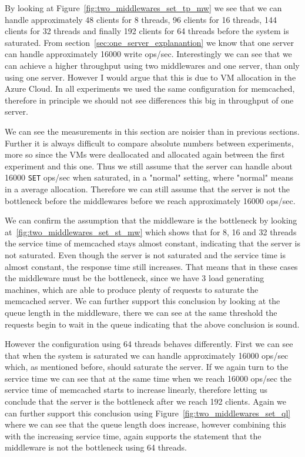 \documentclass[11pt,a4paper]{article}
\begin{document}
%
By looking at Figure~\ref{fig:two_middlewares_set_tp_mw} we see that we can handle approximately 48 clients for 8 threads, 96 clients for 16 threads, 144 clients for 32 threads and finally 192 clients for 64 threads before the system is saturated.
%
From section~\ref{sec:one_server_explanantion} we know that one server can handle approximately 16000 write ops/sec.
%
Interestingly we can see that we can achieve a higher throughput using two middlewares and one server, than only using one server.
%
However I would argue that this is due to VM allocation in the Azure Cloud.
%
In all experiments we used the same configuration for memcached, therefore in principle we should not see differences this big in throughput of one server.

We can see the measurements in this section are noisier than in previous sections.
%
Further it is always difficult to compare absolute numbers between experiments, more so since the VMs were deallocated and allocated again between the first experiment and this one.
%
Thus we still assume that the server can handle about 16000 \texttt{SET} ops/sec when saturated, in a "normal" setting, where "normal" means in a average allocation.
%
Therefore we can still assume that the server is not the bottleneck before the middlewares before we reach approximately 16000 ops/sec.
%
\par
%
We can confirm the assumption that the middleware is the bottleneck by looking at~\ref{fig:two_middlewares_set_st_mw} which shows that for 8, 16 and 32 threads the service time of memcached stays almost constant, indicating that the server is not saturated. 
%
Even though the server is not saturated and the service time is almost constant, the response time still increases.
%
That means that in these cases the middleware must be the bottleneck, since we have 3 load generating machines, which are able to produce plenty of requests to saturate the memcached server.
%
We can further support this conclusion by looking at the queue length in the middleware, there we can see at the same threshold the requests begin to wait in the queue indicating that the above conclusion is sound.
%
\par
%
However the configuration using 64 threads behaves differently.
%
First we can see that when the system is saturated we can handle approximately 16000 ops/sec which, as mentioned before, should saturate the server.
%
If we again turn to the service time we can see that at the same time when we reach 16000 ops/sec the service time of memcached starts to increase linearly, therefore letting us conclude that the server is the bottleneck after we reach 192 clients.
%
Again we can further support this conclusion using Figure~\ref{fig:two_middlewares_set_ql} where we can see that the queue length  does increase, however combining this with the increasing service time, again supports the statement that the middleware is not the bottleneck using 64 threads.
%
\end{document}
